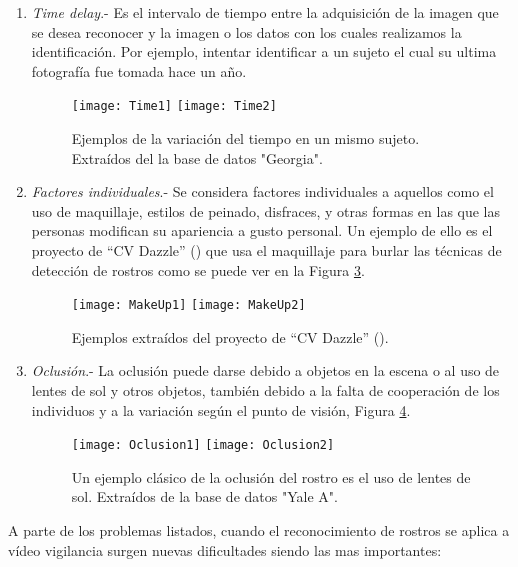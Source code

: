 \begin{enumerate}
\begin{figure}[h]
\label{im:EjemExpresion}
\end{figure}
\item \textit{Time delay}.- Es el intervalo de tiempo entre la adquisición de la imagen que se desea reconocer y la imagen o los datos con los cuales realizamos la identificación. Por ejemplo, intentar identificar a un sujeto el cual su ultima fotografía fue tomada hace un año.
\begin{figure}[h]
\center
\texttt{[image: Time1]}
\texttt{[image: Time2]}
\caption{Ejemplos de la variación del tiempo en un mismo sujeto. Extraídos del la base de datos "Georgia".}
\label{im:EjemTimeDelay}
\end{figure}
\item \textit{Factores individuales}.- Se considera factores individuales a aquellos como el uso de maquillaje, estilos de peinado, disfraces, y otras formas en las que las personas modifican su apariencia a gusto personal. Un ejemplo de ello es el proyecto de ``CV Dazzle'' (\cite{harvey2014cv}) que usa el maquillaje para burlar las técnicas de detección de rostros como se puede ver en la Figura \ref{im:EjemMakeUp}.
\begin{figure}[h]
\center
\texttt{[image: MakeUp1]}
\texttt{[image: MakeUp2]}
\caption{Ejemplos extraídos del proyecto de ``CV Dazzle'' (\cite{harvey2014cv}).}
\label{im:EjemMakeUp}
\end{figure}
\item \textit{Oclusión}.- La oclusión puede darse debido a objetos en la escena o al uso de lentes de sol y otros objetos, también debido a la falta de cooperación de los individuos y a la variación según el punto de visión, Figura \ref{im:EjemOclusion}.
\begin{figure}[h]
\center
\texttt{[image: Oclusion1]}
\texttt{[image: Oclusion2]}
\caption{Un ejemplo clásico de la oclusión del rostro es el uso de lentes de sol. Extraídos de la base de datos "Yale A".}
\label{im:EjemOclusion}
\end{figure}
\end{enumerate}

A parte de los problemas listados, cuando el reconocimiento de rostros se aplica a  vídeo vigilancia surgen nuevas dificultades siendo las mas importantes:

